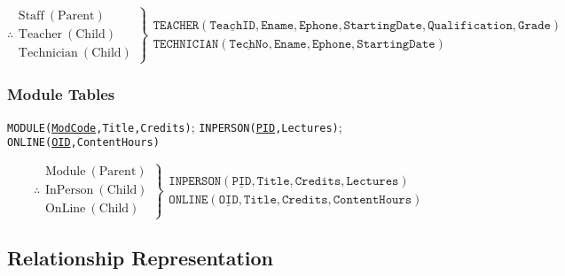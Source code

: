 \documentclass[11pt, english]{article}
\begin{document}
	$$\therefore\left.\begin{array}{r}
		\mathrm{Staff\ (Parent)}\\
		\mathrm{Teacher\ (Child)}\\
		\mathrm{Technician\ (Child)}
	\end{array}\right\}
	\begin{array}{l}
		\mathtt{TEACHER(\underline{TeachID}, Ename, Ephone, StartingDate, Qualification, Grade)}\\
		\mathtt{TECHNICIAN(\underline{TechNo}, Ename, Ephone, StartingDate)}
	\end{array}$$

		\subsubsection{Module Tables}

	\begin{center}
		\texttt{MODULE(\underline{ModCode},Title,Credits)}; \texttt{INPERSON(\underline{PID},Lectures)}; \texttt{ONLINE(\underline{OID},ContentHours)}
	\end{center}
	
	$$\therefore\left.\begin{array}{r}
		\mathrm{Module\ (Parent)}\\
		\mathrm{InPerson\ (Child)}\\
		\mathrm{OnLine\ (Child)}
	\end{array}\right\}
	\begin{array}{l}
		\mathtt{INPERSON(\underline{PID}, Title, Credits, Lectures)}\\
		\mathtt{ONLINE(\underline{OID}, Title, Credits, ContentHours)}
	\end{array}$$

	\subsection{Relationship Representation}
\end{document}
